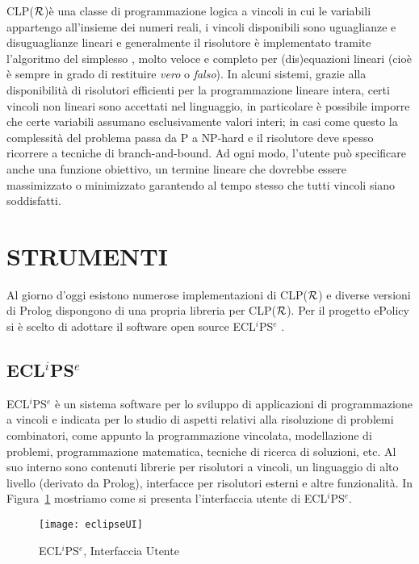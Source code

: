 \documentclass[12pt,a4paper,openright,twoside]{report}
\newcommand{\clpr}{CLP({\ensuremath{\cal R}})}
\begin{document}
\clpr è una classe di programmazione logica a vincoli in cui le variabili appartengo all'insieme dei numeri reali, i vincoli disponibili sono uguaglianze e disuguaglianze lineari e generalmente il risolutore è implementato tramite l'algoritmo del simplesso \cite{dantzig51}, molto veloce e completo per (dis)equazioni lineari (cioè è sempre in grado di restituire \emph{vero} o \emph{falso}). In alcuni sistemi, grazie alla disponibilità di risolutori efficienti per la programmazione lineare intera, certi vincoli non lineari sono accettati nel linguaggio, in particolare è possibile imporre che certe variabili assumano esclusivamente valori interi; in casi come questo la complessità del problema passa da P a NP-hard e il risolutore deve spesso ricorrere a tecniche di branch-and-bound. Ad ogni modo, l'utente può specificare anche una funzione obiettivo, un termine lineare che dovrebbe essere massimizzato o minimizzato garantendo al tempo stesso che tutti vincoli siano soddisfatti.


\section{STRUMENTI}
Al giorno d'oggi esistono numerose implementazioni di \clpr \cite{inclpR} e diverse versioni di Prolog dispongono di una propria libreria per \clpr. Per il progetto ePolicy si è scelto di adottare il software open source  ECL$^i$PS$^e$ \cite{clpEclipse,fromLPtoCLPeclipse}.

\subsection{ECL$^i$PS$^e$}
ECL$^i$PS$^e$ è un sistema software per lo sviluppo di applicazioni di programmazione a vincoli e indicata per lo studio di aspetti relativi alla risoluzione di problemi combinatori, come appunto la programmazione vincolata, modellazione di problemi, programmazione matematica, tecniche di ricerca di soluzioni, etc. Al suo interno sono contenuti librerie per risolutori a vincoli, un linguaggio di alto livello (derivato da Prolog), interfacce per risolutori esterni e altre funzionalità. In Figura~\ref{eclipseUI} mostriamo come si presenta l'interfaccia utente di ECL$^i$PS$^e$.

\begin{figure}[h]
	\centering
	\texttt{[image: eclipseUI]}
	\caption{ECL$^i$PS$^e$, Interfaccia Utente}
	\label{eclipseUI}
\end{figure}
\end{document}
